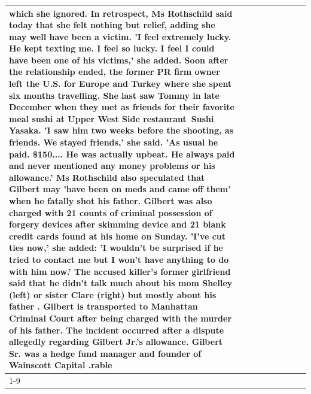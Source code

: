 \begin{table}[H]
\begin{tabular}{lllrlllll}
which she ignored. In retrospect, Ms Rothschild said today that she felt nothing but relief, adding she may well have been a victim. 'I feel extremely lucky. He kept texting me. I feel so lucky. I feel I could have been one of his victims,' she added. Soon after the relationship ended, the former PR firm owner left the U.S. for Europe and Turkey where she spent six months  travelling. She last saw Tommy in late December when they met as friends for their favorite meal sushi at Upper West Side restaurant Sushi Yasaka. 'I saw him two weeks before the shooting, as friends. We stayed friends,' she said. 'As usual he paid. \$150.... He was actually upbeat. He always paid and never mentioned any money problems or his allowance.' Ms Rothschild also speculated that Gilbert may 'have been on meds and came off them' when he fatally shot his father. Gilbert was also charged with 21 counts of criminal possession of forgery devices after skimming device and 21 blank credit cards found at his home on Sunday. 'I've cut ties now,' she added: 'I wouldn’t be surprised if he tried to contact me but I won’t have anything to do with him now.' The accused killer's former girlfriend said that he didn't talk much about his mom Shelley (left) or sister Clare (right) but mostly about his father . Gilbert is transported to Manhattan Criminal Court  after being charged with the murder of his father. The incident occurred after a dispute allegedly regarding Gilbert Jr.'s allowance. Gilbert Sr. was a hedge fund manager and founder of Wainscott Capital .rable \\
\cline{1-9}

\end{tabular}
\end{table}
